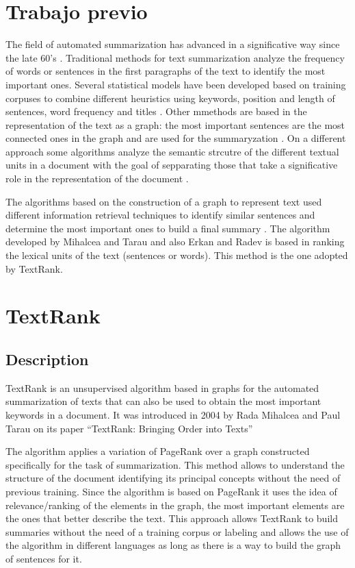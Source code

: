 \documentclass{llncs}
\begin{document}
\section{Trabajo previo}
The field of automated summarization has advanced in a significative way since the late 60's 
\cite{miranda}. Traditional methods for text summarization analyze the frequency of words or sentences in the first paragraphs of the text to identify the most important ones. Several statistical models have been developed based on training corpuses to combine different heuristics using keywords, position and length of sentences, word frequency and titles \cite{hovy}. Other mmethods are based in the representation of the text as a graph: the most important sentences are the most connected ones in the graph and are used for the summaryzation \cite{barzilay}. On a different approach some algorithms analyze the semantic strcutre of the different textual units in a document with the goal of sepparating those that take a significative role in the representation of the document \cite{marcu}.

The algorithms based on the construction of a graph to represent text used different information retrieval techniques to identify similar sentences and determine the most important ones to build a final summary \cite{salton}. The algorithm developed by Mihalcea and Tarau \cite{mihalcea-tarau} and also Erkan and Radev \cite{erkan} is based in ranking the lexical units of the text (sentences or words). This method is the one adopted by TextRank.

\section{TextRank}

\subsection{Description}
TextRank is an unsupervised algorithm based in graphs for the automated summarization of texts that can also be used to obtain the most important keywords in a document. It was introduced in 2004 by Rada Mihalcea and Paul Tarau on its paper “TextRank: Bringing Order into Texts”  \cite{mihalcea-tarau}

The algorithm applies a variation of PageRank \cite{pageetal98} over a graph constructed specifically for the task of summarization. This method allows to understand the structure of the document identifying its principal concepts without the need of previous training. Since the algorithm is based on PageRank it uses the idea of relevance/ranking of the elements in the graph, the most important elements are the ones that better describe the text. This approach allows TextRank to build summaries without the need of a training corpus or labeling and allows the use of the algorithm in different languages as long as there is a way to build the graph of sentences for it.
\end{document}
